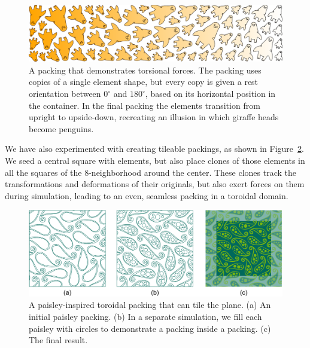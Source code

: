 \begin{figure}
\centering
\includegraphics[width=1.0\textwidth]{figures/repulsionpak/giraffe_penguin.pdf}
\caption[A packing that demonstrates torsional forces]
{\label{giraffe_penguin_packing}
A packing that demonstrates torsional forces.
The packing uses copies of a single element shape, but every copy is given a rest orientation between $0^\circ$
and $180^\circ$, based on its horizontal position in the container.  In the final packing the elements transition
from upright to upside-down, recreating an illusion in which giraffe heads become penguins.}
\end{figure}

We have also experimented with creating tileable packings, as shown
in Figure~\ref{paisley_packing}.  We seed a central square with elements,
but also place clones of those elements in all the squares of the
8-neighborhood around the center.  These clones track the transformations
and deformations of their originals, but also exert forces on them during
simulation, leading to an even, seamless packing in a toroidal domain.

\begin{figure}
\centering
\includegraphics[width=1.0\textwidth]{figures/repulsionpak/paisley_new.pdf} 
\vspace{-10pt}
\caption[A paisley-inspired toroidal packing]
{\label{paisley_packing}
A paisley-inspired toroidal packing that can tile the plane. 
           (a) An initial paisley packing.
           (b) In a separate simulation, we fill each paisley with circles to demonstrate a packing inside a packing.
           (c) The final result.
}
\end{figure}

